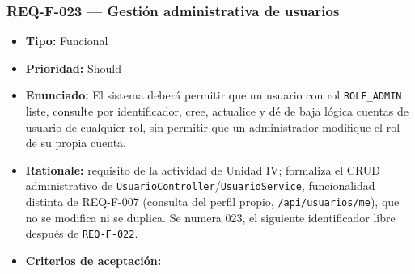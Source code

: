 \documentclass[
  spanish,
]{article}
\providecommand{\tightlist}{%
  \setlength{\itemsep}{0pt}\setlength{\parskip}{0pt}}
\begin{document}
\subsubsection{REQ-F-023 --- Gestión administrativa de
usuarios}\label{req-f-023-gestiuxf3n-administrativa-de-usuarios}

\begin{itemize}
\tightlist
\item
  \textbf{Tipo:} Funcional
\item
  \textbf{Prioridad:} Should
\item
  \textbf{Enunciado:} El sistema deberá permitir que un usuario con rol
  \texttt{ROLE\_\allowbreak{}ADMIN} liste, consulte por identificador, cree,
  actualice y dé de baja lógica cuentas de usuario de cualquier rol, sin
  permitir que un administrador modifique el rol de su propia cuenta.
\item
  \textbf{Rationale:} requisito de la actividad de Unidad IV; formaliza
  el CRUD administrativo de
  \texttt{Usuario\allowbreak{}Controller}/\texttt{Usuario\allowbreak{}Service}, funcionalidad
  distinta de REQ-F-007 (consulta del perfil propio,
  \texttt{/\allowbreak{}api/\allowbreak{}usuarios/\allowbreak{}me}), que no se modifica ni se duplica. Se
  numera 023, el siguiente identificador libre después de
  \texttt{REQ-\allowbreak{}F-\allowbreak{}022}.
\item
  \textbf{Criterios de aceptación:}


\end{itemize}
\end{document}
